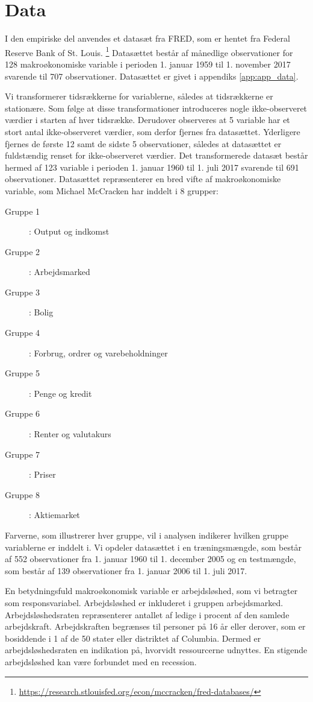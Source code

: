 \chapter{Data} \label{ch:data}
I den empiriske del anvendes et datasæt fra FRED, som er hentet fra Federal Reserve Bank of St. Louis. \footnote{\url{https://research.stlouisfed.org/econ/mccracken/fred-databases/}}
Datasættet består af månedlige observationer for 128 makroøkonomiske variable i perioden 1. januar 1959 til 1. november 2017 svarende til 707 observationer.
Datasættet er givet i appendiks \ref{app:app_data}.

Vi transformerer tidsrækkerne for variablerne, således at tidsrækkerne er stationære.
Som følge at disse transformationer introduceres nogle ikke-observeret værdier i starten af hver tidsrække.
Derudover observeres at 5 variable har et stort antal ikke-observeret værdier, som derfor fjernes fra datasættet.
Yderligere fjernes de første 12 samt de sidste 5 observationer, således at datasættet er fuldstændig renset for ikke-observeret værdier.
Det transformerede datasæt består hermed af 123 variable i perioden 1. januar 1960 til 1. juli 2017 svarende til 691 observationer.
Datasættet repræsenterer en bred vifte af makroøkonomiske variable, som Michael McCracken har inddelt i 8 grupper:
%
\begin{description}
\item [Gruppe 1]: Output og indkomst 
\item [Gruppe 2]: Arbejdsmarked 
\item [Gruppe 3]: Bolig
\item [Gruppe 4]: Forbrug, ordrer og varebeholdninger
\item [Gruppe 5]: Penge og kredit
\item [Gruppe 6]: Renter og valutakurs
\item [Gruppe 7]: Priser
\item [Gruppe 8]: Aktiemarket
\end{description} 
%
Farverne, som illustrerer hver gruppe, vil i analysen indikerer hvilken gruppe variablerne er inddelt i.
Vi opdeler datasættet i en træningsmængde, som består af 552 observationer fra 1. januar 1960 til 1. december 2005 og en testmængde, som består af 139 observationer fra 1. januar 2006 til 1. juli 2017. 

En betydningsfuld makroøkonomisk variable er arbejdsløshed, som vi betragter som responsvariabel.  
Arbejdsløshed er inkluderet i gruppen arbejdsmarked.
Arbejdsløshedsraten repræsenterer antallet af ledige i procent af den samlede arbejdskraft.
Arbejdskraften begrænses til personer på 16 år eller derover, som er bosiddende i 1 af de 50 stater eller distriktet af Columbia.
Dermed er arbejdsløshedsraten en indikation på, hvorvidt ressourcerne udnyttes.
En stigende arbejdsløshed kan være forbundet med en recession.

